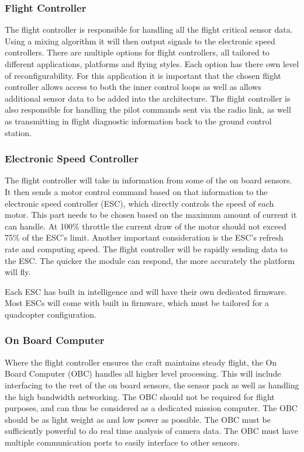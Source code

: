 			\subsubsection{Flight Controller}
			The flight controller is responsible for handling all the flight critical sensor data. Using a mixing algorithm it will then output signals to the electronic speed controllers. There are multiple options for flight controllers, all tailored to different applications, platforms and flying styles. Each option has there own level of reconfigurability. For this application it is important that the chosen flight controller allows access to both the inner control loops as well as allows additional sensor data to be added into the architecture. The flight controller is also responsible for handling the pilot commands sent via the radio link, as well as transmitting in flight diagnostic information back to the ground control station.
				
			\subsubsection{Electronic Speed Controller}
			The flight controller will take in information from some of the on board sensors. It then sends a motor control command based on that information to the electronic speed controller (ESC), which directly controls the speed of each motor. This part needs to be chosen based on the maximum amount of current it can handle. At 100\% throttle the current draw of the motor should not exceed 75\% of the ESC's limit. Another important consideration is the ESC's refresh rate and computing speed. The flight controller will be rapidly sending data to the ESC. The quicker the module can respond, the more accurately the platform will fly. 
			
			Each ESC has built in intelligence and will have their own dedicated firmware. Most ESCs will come with built in firmware, which must be tailored for a quadcopter configuration.
			
			\subsubsection{On Board Computer}
			Where the flight controller ensures the craft maintains steady flight, the On Board Computer (OBC) handles all higher level processing. This will include interfacing to the rest of the on board sensors, the sensor pack as well as handling the high bandwidth networking. The OBC should not be required for flight purposes, and can thus be considered as a dedicated mission computer. 
			The OBC should be as light weight as and low power as possible. The OBC must be sufficiently powerful to do real time analysis of camera data. The OBC must have multiple communication ports to easily interface to other sensors.
					
